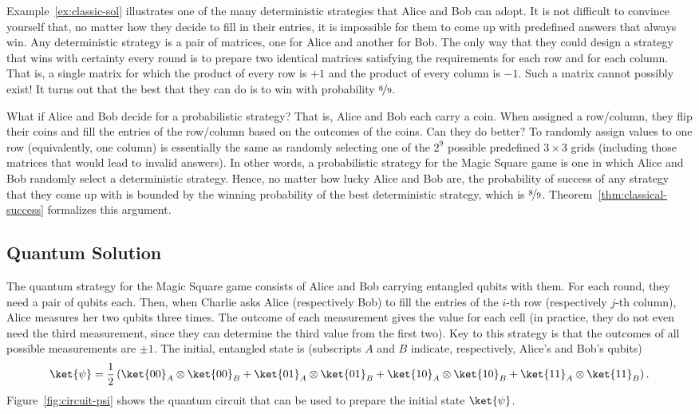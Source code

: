 \documentclass{llncs}
\begin{document}
Example~\ref{ex:classic-sol} illustrates one of the many deterministic
strategies that Alice and Bob can adopt. It is not difficult to
convince yourself that, no matter how they decide to fill in
their entries, it is impossible for them to come up with predefined
answers that always win. Any deterministic strategy is a pair of
matrices, one for Alice and another for Bob. The only way that they could
design a strategy that wins with certainty every round is to prepare two
identical matrices satisfying the requirements for each row and for each
column. That is, a single matrix for which the product of every row is
\(+1\) and the product of every column is \(-1\). Such a matrix cannot
possibly exist! It turns out that the best that they can do is to win
with probability \(\nicefrac{8}{9}\).

What if Alice and Bob decide for a probabilistic strategy? That is, Alice and
Bob each carry a coin. When assigned a row/column, they flip their
coins and fill the entries of the row/column based on the outcomes of
the coins. Can they do better? To randomly assign values to one row
(equivalently, one column) is essentially the same as randomly
selecting one of the \(2^{9}\) possible predefined \(3 \times 3\)
grids (including those matrices that would lead to invalid
answers). In other words, a probabilistic strategy for the Magic
Square game is one in which Alice and Bob randomly select a
deterministic strategy. Hence, no matter how lucky Alice and Bob are,
the probability of success of any strategy that they come up with is
bounded by the winning probability of the best deterministic strategy,
which is \(\nicefrac{8}{9}\). Theorem~\ref{thm:classical-success}
formalizes this argument.

\subsection{Quantum Solution}
\label{sec:quantum-sol}
The quantum strategy for the Magic Square game consists of Alice and
Bob carrying entangled qubits with them. For each round, they need a
pair of qubits each. Then, when Charlie asks Alice (respectively Bob)
to fill the entries of the \(i\)-th row (respectively \(j\)-th
column), Alice measures her two qubits three times. The outcome of
each measurement gives the value for each cell (in practice, they do
not even need the third measurement, since they can determine the third
value from the first two). Key to this strategy is that the outcomes
of all possible measurements are \(\pm 1\). The initial, entangled state
is (subscripts \(A\) and \(B\) indicate, respectively,
Alice's and Bob's qubits)
\begin{equation}
  \ket{\psi} = \frac{1}{2}\left(
    \ket{00}_{A} \otimes \ket{00}_{B} + \ket{01}_{A} \otimes \ket{01}_{B} +
    \ket{10}_{A} \otimes \ket{10}_{B} + \ket{11}_{A} \otimes \ket{11}_{B}
  \right).
\end{equation}
Figure~\ref{fig:circuit-psi} shows the quantum circuit that can be
used to prepare the initial state \(\ket{\psi}\).
\end{document}
